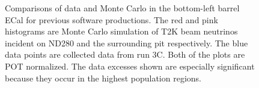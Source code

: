 \begin{figure}%
  \centering
  \hspace{1em}

  \caption{Comparisons of data and Monte Carlo in the bottom-left barrel ECal for previous software productions.  The red and pink histograms are Monte Carlo simulation of T2K beam neutrinos incident on ND280 and the surrounding pit respectively.  The blue data points are collected data from run 3C.  Both of the plots are POT normalized.  The data excesses shown are especially significant because they occur in the highest population regions.}
  \label{fig:BLBNoField}
\end{figure}
